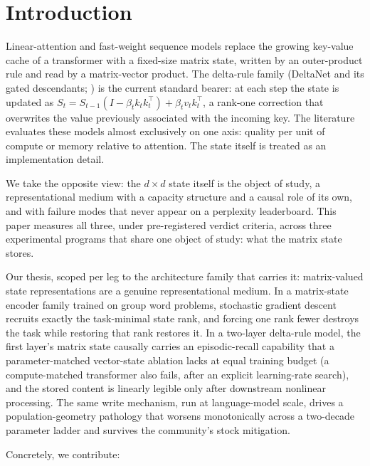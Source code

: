 \section{Introduction}

Linear-attention and fast-weight sequence models replace the growing
key-value cache of a transformer with a fixed-size matrix state,
written by an outer-product rule and read by a matrix-vector product.
The delta-rule family (DeltaNet and its gated descendants; \citealp{yang2025parallelizinglineartransformersdelta,yang2025gateddeltanetworksimproving}) is the
current standard bearer: at each step the state is updated as
$S_t = S_{t-1}(I - \beta_t k_t k_t^{\top}) + \beta_t v_t k_t^{\top}$,
a rank-one correction that overwrites the value previously associated
with the incoming key. The literature evaluates these models almost
exclusively on one axis: quality per unit of compute or memory relative
to attention. The state itself is treated as an implementation detail.

We take the opposite view: the $d \times d$ state itself is the object
of study, a representational medium with a capacity structure and a
causal role of its own, and with failure modes that never appear on a
perplexity leaderboard. This paper measures all three, under
pre-registered verdict criteria, across three experimental programs that
share one object of study: what the matrix state stores.

Our thesis, scoped per leg to the architecture family that carries it:
matrix-valued state representations are a genuine representational
medium. In a matrix-state encoder family trained on group word problems,
stochastic gradient descent recruits exactly the task-minimal state rank,
and forcing one rank fewer destroys the task while restoring that rank
restores it. In a two-layer delta-rule model, the first layer's matrix
state causally carries an episodic-recall capability that a
parameter-matched vector-state ablation lacks at equal training budget
(a compute-matched transformer also fails, after an explicit
learning-rate search), and the stored content is linearly legible only after
downstream nonlinear processing. The same write mechanism, run at language-model scale, drives a
population-geometry pathology that worsens monotonically across a
two-decade parameter ladder and survives the community's stock
mitigation.

Concretely, we contribute:

